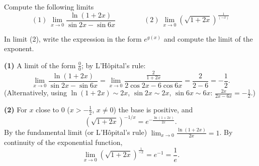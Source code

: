 
\begin{question}
Compute the following limits
\[ (1)\ \lim_{x\to0}\frac{\ln(1+2x)}{\sin2x-\sin6x}\qquad\qquad (2)\ \lim_{x\to0}\left(\sqrt{1+2x}\right)^{\frac{1}{(-x)}} \]
\end{question}

\begin{hint}
In limit (2), write the expression in the form $e^{g(x)}$ and compute the limit of the exponent.
\end{hint}

\begin{solution}
\textbf{(1)} A limit of the form $\frac00$; by L'Hôpital's rule:
\[ \lim_{x\to0}\frac{\ln(1+2x)}{\sin2x-\sin6x}=\lim_{x\to0}\frac{\frac{2}{1+2x}}{2\cos2x-6\cos6x}=\frac{2}{2-6}=\boxed{-\frac12}. \]
(Alternatively, using $\ln(1+2x)\sim2x$, $\sin2x\sim2x$, $\sin6x\sim6x$: $\frac{2x}{2x-6x}=-\frac12$.)

\textbf{(2)} For $x$ close to $0$ ($x>-\frac12$, $x\neq0$) the base is positive, and
\[ \left(\sqrt{1+2x}\right)^{-1/x}=e^{-\frac{\ln(1+2x)}{2x}}. \]
By the fundamental limit (or L'Hôpital's rule) $\lim_{x\to0}\frac{\ln(1+2x)}{2x}=1$. By continuity of the exponential function,
\[ \lim_{x\to0}\left(\sqrt{1+2x}\right)^{\frac{1}{-x}}=e^{-1}=\boxed{\frac1e}. \]
\end{solution}
